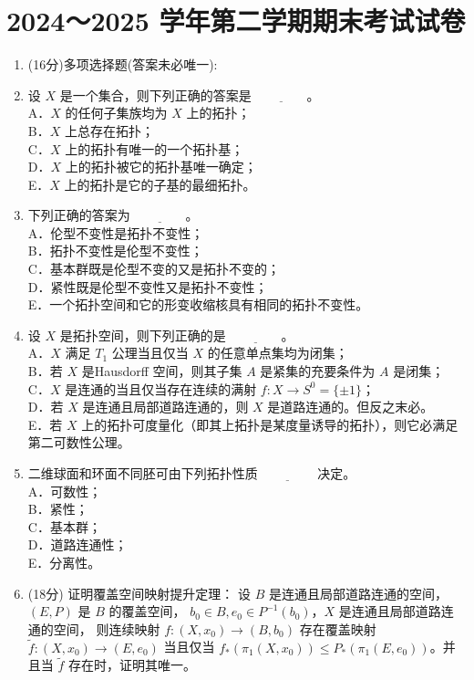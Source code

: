 \section{2024～2025 学年第二学期期末考试试卷}
\begin{enumerate}
\item[一、](16分)多项选择题(答案未必唯一):
\item 设 $X$ 是一个集合，则下列正确的答案是 $\underline{\qquad\qquad}$。\\
A．$X$ 的任何子集族均为 $X$ 上的拓扑；\\
B．$X$ 上总存在拓扑；\\
C．$X$ 上的拓扑有唯一的一个拓扑基；\\
D．$X$ 上的拓扑被它的拓扑基唯一确定；\\
E．$X$ 上的拓扑是它的子基的最细拓扑。

\item 下列正确的答案为 $\underline{\qquad\qquad}$。\\
A．伦型不变性是拓扑不变性；\\
B．拓扑不变性是伦型不变性；\\
C．基本群既是伦型不变的又是拓扑不变的；\\
D．紧性既是伦型不变性又是拓扑不变性；\\
E．一个拓扑空间和它的形变收缩核具有相同的拓扑不变性。

\item 设 $X$ 是拓扑空间，则下列正确的是 $\underline{\qquad\qquad}$。\\
A．$X$ 满足 $T_1$ 公理当且仅当 $X$ 的任意单点集均为闭集；\\
B．若 $X$ 是Hausdorff 空间，则其子集 $A$ 是紧集的充要条件为 $A$ 是闭集；\\
C．$X$ 是连通的当且仅当存在连续的满射 $f: X \rightarrow S^0=\{ \pm 1\}$；\\
D．若 $X$ 是连通且局部道路连通的，则 $X$ 是道路连通的。但反之末必。\\
E．若 $X$ 上的拓扑可度量化（即其上拓扑是某度量诱导的拓扑），则它必满足第二可数性公理。

\item 二维球面和环面不同胚可由下列拓扑性质 $\underline{\qquad\qquad}$ 决定。\\
A．可数性；\\
B．紧性；\\
C．基本群；\\
D．道路连通性；\\
E．分离性。

\item[二、](18分) 证明覆盖空间映射提升定理：
设 $B$ 是连通且局部道路连通的空间，$(E, P)$ 是 $B$ 的覆盖空间，
$b_0 \in B,  e_0 \in P^{-1}(b_0)$，$X$ 是连通且局部道路连通的空间，
则连续映射 $f:(X, x_0) \rightarrow (B, b_0)$ 存在覆盖映射 $\tilde{f}:(X, x_0) \rightarrow (E, e_0)$ 
当且仅当 $f_*(\pi_1(X, x_0)) \leq P_*(\pi_1(E, e_0))$。并且当 $\tilde{f}$ 存在时，证明其唯一。


\end{enumerate}
